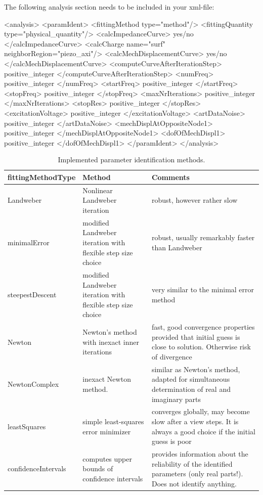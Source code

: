 The following analysis section needs to be included in your xml-file:
\begin{xmllisting}
<analysis>
  <paramIdent>
    <fittingMethod type="method"/>
    <fittingQuantity type="physical_quantity"/>
    <calcImpedanceCurve> yes/no </calcImpedanceCurve>
    <calcCharge name="surf" neighborRegion="piezo_axi"/>
    <calcMechDisplacementCurve> yes/no </calcMechDisplacementCurve>
    <computeCurveAfterIterationStep> positive_integer
</computeCurveAfterIterationStep>
    <numFreq> positive_integer </numFreq>
    <startFreq> positive_integer </startFreq>
    <stopFreq> positive_integer </stopFreq>
    <maxNrIterations> positive_integer </maxNrIterations>
    <stopRes> positive_integer </stopRes>
    <excitationVoltage> positive_integer </excitationVoltage>
    <artDataNoise> positive_integer </artDataNoise>
    <mechDisplAtOppositeNode1> positive_integer </mechDisplAtOppositeNode1>
    <dofOfMechDispl1> positive_integer </dofOfMechDispl1>
  </paramIdent>
</analysis>
\end{xmllisting}



\begin{table}
\begin{center}
\caption{Implemented parameter identification methods.}
\label{TableFittingMethods}
\vspace{0.5cm}
\begin{tabular}{lp{}p{} }
\toprule
{\bf fittingMethodType} & {\bf Method} & {\bf Comments} \\
\midrule
Landweber &  Nonlinear Landweber iteration & robust, however rather slow \\ 
\midrule
minimalError &  modified Landweber iteration with flexible step size choice &
robust, usually remarkably faster than Landweber\\ 
\midrule
steepestDescent &  modified Landweber iteration with flexible step size choice 
& very similar to the minimal error method \\ 
\midrule
Newton & Newton's method with inexact inner iterations & fast, good convergence
properties provided that initial guess is close to solution. Otherwise risk of
divergence \\ 
\midrule
NewtonComplex & inexact Newton method. & similar as Newton's method, adapted for
simultaneous determination of real and imaginary parts \\
\midrule
leastSquares & simple least-squares error minimizer & converges globally, may
become slow after a view steps. It is always a good choice if the initial guess
is poor\\
\midrule
confidenceIntervals & computes upper bounds of confidence intervals& provides
information about the reliability of the identified parameters (only real
parts!). Does not identify anything.\\
\bottomrule
\end{tabular}
\end{center}
\end{table} 

